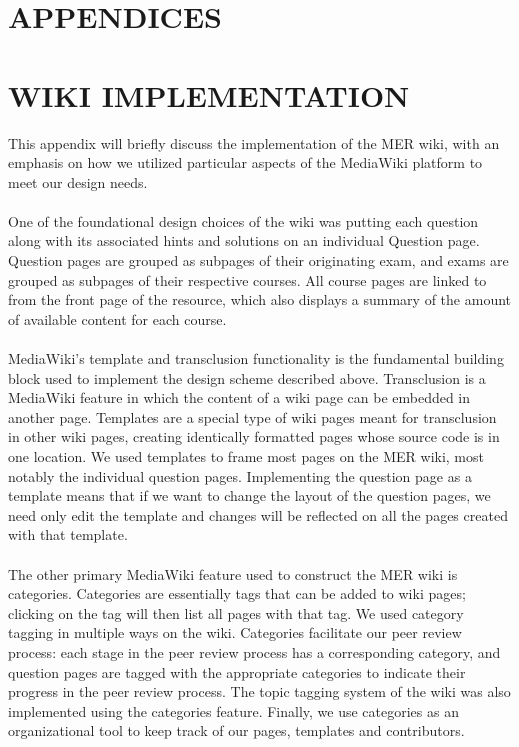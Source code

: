 \documentclass{primus}
\begin{document}
%
%

\section*{APPENDICES}

\appendix

\section{WIKI IMPLEMENTATION}\label{sec:Appendix}

This appendix will briefly discuss the implementation of the MER wiki, with an emphasis on how we utilized particular aspects of the MediaWiki platform to meet our design needs.
\\\\  
\noindent{}One of the foundational design choices of the wiki was putting each question along with its associated hints and solutions on an individual Question page.  Question pages are grouped as subpages of their originating exam, and exams are grouped as subpages of their respective courses.  All course pages are linked to from the front page of the resource, which also displays a summary of the amount of available content for each course.
\\\\
\noindent{}MediaWiki’s template and transclusion functionality is the fundamental building block used to implement the design scheme described above.  Transclusion is a MediaWiki feature in which the content of a wiki page can be embedded in another page.  Templates are a special type of wiki pages meant for transclusion in other wiki pages, creating identically formatted pages whose source code is in one location.  We used templates to frame most pages on the MER wiki, most notably the individual question pages.  Implementing the question page as a template means that if we want to change the layout of the question pages, we need only edit the template and changes will be reflected on all the pages created with that template.
\\\\
\noindent{}The other primary MediaWiki feature used to construct the MER wiki is categories.  Categories are essentially tags that can be added to wiki pages; clicking on the tag will then list all pages with that tag.  We used category tagging in multiple ways on the wiki.  Categories facilitate our peer review process: each stage in the peer review process has a corresponding category, and  question pages are tagged with the appropriate categories to indicate their progress in the peer review process.  The topic tagging system of the wiki was also implemented using the categories feature.   Finally, we use categories as an organizational tool to keep track of our pages, templates and contributors.
\end{document}
